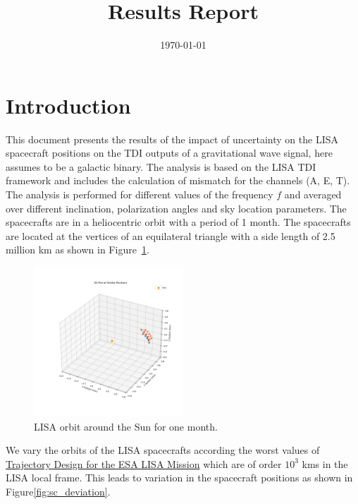\documentclass[a4paper,12pt]{article}
\title{Results Report}
\author{}
\date{\today}
\begin{document}
\maketitle


\section{Introduction}
This document presents the results of the impact of uncertainty on the LISA spacecraft positions on the TDI outputs of a gravitational wave signal, here assumes to be a galactic binary. The analysis is based on the LISA TDI framework and includes the calculation of mismatch for the channels (A, E, T). 
The analysis is performed for different values of the frequency $f$ and averaged over different inclination, polarization angles and sky location parameters. The spacecrafts are in a heliocentric orbit with a period of 1 month. The spacecrafts are located at the vertices of an equilateral triangle with a side length of 2.5 million km as shown in Figure~\ref{fig:lisa_orbit}. 
 
\begin{figure}
    \centering
    \includegraphics[width=0.5\textwidth]{3d_orbit_around_sun.png}
    \caption{LISA orbit around the Sun for one month.}
    \label{fig:lisa_orbit}
\end{figure}

We vary the orbits of the LISA spacecrafts according the worst values of \href{https://doi.org/10.1007/s40295-021-00263-2}{Trajectory Design for the ESA LISA Mission} which are of order $10^3$ kms in the LISA local frame. This leads to variation in the spacecraft positions as shown in Figure\ref{fig:sc_deviation}.
\end{document}
